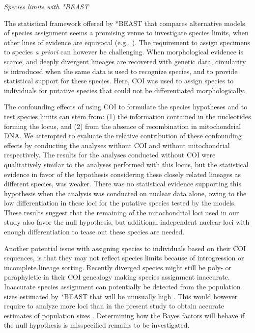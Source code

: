 \documentclass[12pt,letterpaper]{article}\usepackage[]{graphicx}\usepackage[]{color}
\renewcommand{\subsection}[1]{%
\bigskip
\begin{center}
\begin{large}
\normalfont\itshape #1
\end{large}
\end{center}}
\begin{document}
\subsection{Species limits with *BEAST}

The statistical framework offered by *BEAST that compares alternative models of
species assignment seems a promising venue to investigate species limits, when
other lines of evidence are equivocal (e.g., \citep{Grummer2014,
  Satler2013}). The requirement to assign specimens to species \textit{a priori}
can however be challenging. When morphological evidence is scarce, and deeply
divergent lineages are recovered with genetic data, circularity is introduced
when the same data is used to recognize species, and to provide statistical
support for these species. Here, COI was used to assign species to individuals
for putative species that could not be differentiated morphologically.

The confounding effects of using COI to formulate the species hypotheses and to
test species limits can stem from: (1) the information contained in the
nucleotides forming the locus, and (2) from the absence of recombination in
mitochondrial DNA. We attempted to evaluate the relative contribution of these
confounding effects by conducting the analyses without COI and without
mitochondrial respectively. The results for the analyses conducted without COI
were qualitatively similar to the analyses performed with this locus, but the
statistical evidence in favor of the hypothesis considering these closely
related lineages as different species, was weaker. There was no statistical
evidence supporting this hypothesis when the analysis was conducted on nuclear
data alone, owing to the low differentiation in these loci for the putative
species tested by the models. These results suggest that the remaining of the
mitochondrial loci used in our study also favor the null hypothesis, but
additional independent nuclear loci with enough differentiation to tease out
these species are needed.

Another potential issue with assigning species to individuals based on their COI
sequences, is that they may not reflect species limits because of introgression
or incomplete lineage sorting. Recently diverged species might still be poly- or
paraphyletic in their COI genealogy making species assignment
inaccurate. Inaccurate species assignment can potentially be detected from the
population sizes estimated by *BEAST that will be unusually high
\citep{Leache2013, Drummond2014}. This would however require to analyze more loci
than in the present study to obtain accurate estimates of population sizes
\citep{Heled2010, Harris2013}. Determining how the Bayes factors will behave if
the null hypothesis is misspecified remains to be investigated.
\end{document}
